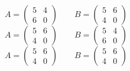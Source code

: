\documentclass{exam}
\begin{document}
\begin{questions}
\begin{checkboxes}
   \choice 
        \[
            A = \begin{pmatrix}
                5 & 4\\
                6 & 0
                \end{pmatrix}
                \qquad
            B = \begin{pmatrix}
                5 & 6\\
                4 & 0
                \end{pmatrix}
        \]
   \choice 
        \[
            A = \begin{pmatrix}
                5 & 6\\
                4 & 0
                \end{pmatrix}
                \qquad
            B = \begin{pmatrix}
                5 & 4\\
                6 & 0
                \end{pmatrix}
        \]
   \choice 
        \[
            A = \begin{pmatrix}
                5 & 6\\
                4 & 0
                \end{pmatrix}
                \qquad
            B = \begin{pmatrix}
                5 & 6\\
                4 & 0
                \end{pmatrix}
        \]

\end{checkboxes}
\end{questions}
\end{document}
